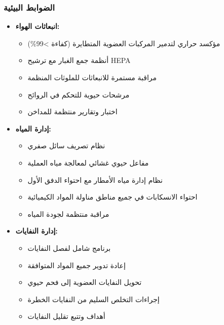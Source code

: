 \subsubsection{الضوابط البيئية}
\begin{itemize}
    \item \textbf{انبعاثات الهواء:}
    \begin{itemize}
        \item مؤكسد حراري لتدمير المركبات العضوية المتطايرة (كفاءة >99\%)
        \item أنظمة جمع الغبار مع ترشيح HEPA
        \item مراقبة مستمرة للانبعاثات للملوثات المنظمة
        \item مرشحات حيوية للتحكم في الروائح
        \item اختبار وتقارير منتظمة للمداخن
    \end{itemize}
    
    \item \textbf{إدارة المياه:}
    \begin{itemize}
        \item نظام تصريف سائل صفري
        \item مفاعل حيوي غشائي لمعالجة مياه العملية
        \item نظام إدارة مياه الأمطار مع احتواء الدفق الأول
        \item احتواء الانسكابات في جميع مناطق مناولة المواد الكيميائية
        \item مراقبة منتظمة لجودة المياه
    \end{itemize}
    
    \item \textbf{إدارة النفايات:}
    \begin{itemize}
        \item برنامج شامل لفصل النفايات
        \item إعادة تدوير جميع المواد المتوافقة
        \item تحويل النفايات العضوية إلى فحم حيوي
        \item إجراءات التخلص السليم من النفايات الخطرة
        \item أهداف وتتبع تقليل النفايات
    \end{itemize}
\end{itemize}

